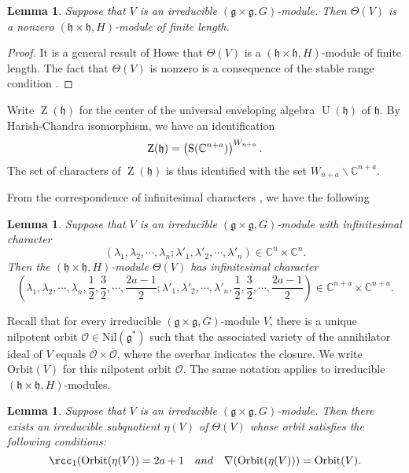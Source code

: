 \documentclass[12pt,a4paper]{amsart}
\newcommand{\BC}{{\mathbb {C}}}
\newcommand{\CO}{{\mathcal {O}}}
\newcommand{\oS}{\operatorname{S}}
\newcommand{\oZ}{\operatorname{Z}}
\newcommand{\oU}{\operatorname{U}}
\newcommand{\g}{\mathfrak g}
\newcommand{\h}{\mathfrak h}
\numberwithin{equation}{section}
\newtheorem{lem}[thm]{Lemma}
\theoremstyle{remark}
\def\orb{\mathrm{Orbit}}
\begin{document}
\begin{lem}\label{theta1}
Suppose that $V$ is an irreducible $(\g\times \g, G)$-module. Then $\Theta(V)$ is a nonzero $(\h\times \h, H)$-module of finite length.
\end{lem}

\begin{proof} It is a general result of Howe \cite{Howe89} that $\Theta(V)$ is a $(\h\times \h, H)$-module of finite length. The fact that $\Theta(V)$ is nonzero is a consequence of the stable range condition
\cite{PrPr}.
\end{proof}


Write $\oZ(\h)$ for the center of the universal enveloping algebra $\oU(\h)$ of $\h$.  By Harish-Chandra isomorphism, we have an identification
\[
 \oZ(\h)=\left(\oS(\C^{n+a})\right)^{W_{n+a}}.
\]
The set of characters of $\oZ(\h)$ is thus identified with the set $W_{n+a}\backslash \BC^{n+a}$.

From the correspondence of infinitesimal characters \cite{PrzInf}, we have the following

\begin{lem}\label{theta2}
Suppose that $V$ is an irreducible $(\g\times \g, G)$-module with infinitesimal character
\[
  (\lambda_1, \lambda_2, \cdots, \lambda_n; \lambda'_1, \lambda'_2, \cdots, \lambda'_n)\in \BC^n\times \BC^n.
\]
Then the $(\h\times \h, H)$-module  $\Theta(V)$ has infinitesimal character
\[
  (\lambda_1, \lambda_2, \cdots, \lambda_n, \frac{1}{2}, \frac{3}{2}, \cdots, \frac{2a-1}{2} ; \lambda'_1, \lambda'_2, \cdots, \lambda'_n, \frac{1}{2}, \frac{3}{2}, \cdots, \frac{2a-1}{2})\in \BC^{n+a}\times \BC^{n+a}.
\]
\end{lem}

Recall \cite{Jos} that for every irreducible $(\g\times \g, G)$-module $V$, there is a
unique nilpotent orbit $\CO\in \overline{\mathrm{Nil}}(\g^*)$ such that the associated variety of
the annihilator ideal of $V$ equals $\overline \CO\times \overline \CO$, where
the overbar %
indicates the closure. We write $\mathrm{Orbit}(V)$
for this nilpotent orbit $\CO$. The same notation applies to irreducible
$(\h\times \h, H)$-modules.

\begin{lem}\label{theta3}
  Suppose that $V$ is an irreducible $(\g\times \g, G)$-module. Then there exists an irreducible subquotient $\eta(V)$ of $\Theta(V)$ whose orbit satisfies the following conditions:
 \[
  {\rcc_1(\orb(\eta(V)) = 2a+1 } \quad and \quad \nabla(\mathrm{Orbit}(\eta(V)))=\mathrm{Orbit}(V).
\]
\end{lem}
\end{document}
